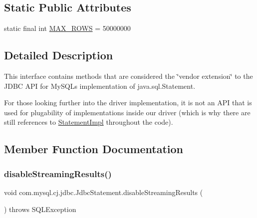 \subsection*{Static Public Attributes}
\begin{DoxyCompactItemize}
\item 
static final int \mbox{\hyperlink{interfacecom_1_1mysql_1_1cj_1_1jdbc_1_1_jdbc_statement_af93a548fefe7b195a578434d9e647a7d}{M\+A\+X\+\_\+\+R\+O\+WS}} = 50000000
\end{DoxyCompactItemize}


\subsection{Detailed Description}
This interface contains methods that are considered the \char`\"{}vendor extension\char`\"{} to the J\+D\+BC A\+PI for My\+S\+QL\textquotesingle{}s implementation of java.\+sql.\+Statement.

For those looking further into the driver implementation, it is not an A\+PI that is used for plugability of implementations inside our driver (which is why there are still references to \mbox{\hyperlink{classcom_1_1mysql_1_1cj_1_1jdbc_1_1_statement_impl}{Statement\+Impl}} throughout the code). 

\subsection{Member Function Documentation}
\mbox{\label{interfacecom_1_1mysql_1_1cj_1_1jdbc_1_1_jdbc_statement_a11240571041f264e6bdde12ee05355a5}} 
\subsubsection{\texorpdfstring{disable\+Streaming\+Results()}{disableStreamingResults()}}
{\footnotesize\ttfamily void com.\+mysql.\+cj.\+jdbc.\+Jdbc\+Statement.\+disable\+Streaming\+Results (\begin{DoxyParamCaption}{ }\end{DoxyParamCaption}) throws S\+Q\+L\+Exception}

